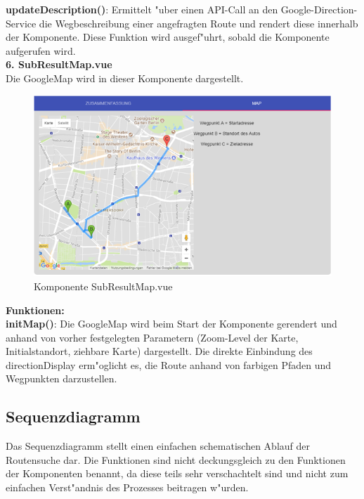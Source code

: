 \documentclass[a4paper, 11pt]{scrreprt}
\begin{document}
\textbf{updateDescription()}: Ermittelt "uber einen API-Call an den Google-Direction-Service die Wegbeschreibung einer angefragten Route und rendert diese innerhalb der Komponente. Diese Funktion wird ausgef"uhrt, sobald die Komponente aufgerufen wird.\\

\textbf{6. SubResultMap.vue}\\

Die GoogleMap wird in dieser Komponente dargestellt.\\


\begin{figure} [H]
\begin{center}
\includegraphics[scale=1]{SubResultMap.png}
\caption{Komponente SubResultMap.vue}
\label{SubResultMap}
\end{center}
\end{figure}


\textbf{Funktionen:}\\

\textbf{initMap()}: Die GoogleMap wird beim Start der Komponente gerendert und anhand von vorher festgelegten Parametern (Zoom-Level der Karte, Initialstandort, ziehbare Karte)  dargestellt. Die direkte Einbindung des directionDisplay erm"oglicht es, die Route anhand von farbigen Pfaden und Wegpunkten darzustellen.\\


\subsection{Sequenzdiagramm}
Das Sequenzdiagramm stellt einen einfachen schematischen Ablauf der Routensuche dar. Die Funktionen sind nicht deckungsgleich zu den Funktionen der Komponenten benannt, da diese teils sehr verschachtelt sind und nicht zum einfachen Verst"andnis des Prozesses beitragen w"urden.\\
\end{document}
